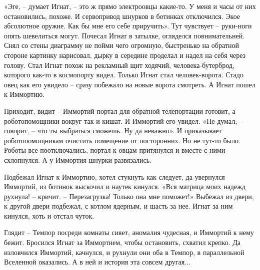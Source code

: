 \documentclass[ebook,oneside,final,openright]{memoir}
\begin{document}
\par
«Эге, – думает Игнат, – это ж прямо электроовцы какие-то. У меня и часы от них остановились, похоже. И сервопривод шнурков в ботинках отключился. Экое абсолютное оружие. Как бы мне его себе приручить». Тут чувствует – руки-ноги опять шевелиться могут. Почесал Игнат в затылке, огляделся повнимательней. Снял со стены диаграмму не пойми чего огромную, быстренько на обратной стороне картинку нарисовал, дырку в середине проделал и надел на себя через голову. Стал Игнат похож на рекламный щит ходячий, человека-бутерброд, которого как-то в космопорту видел. Только Игнат стал человек-ворота. Стадо овец как его увидело – сразу побежало на новые ворота смотреть. А Игнат пошел к Иммортию.\par
\par
Приходит, видит – Иммортий портал для обратной телепортации готовит, а роботопомощники вокруг так и кишат. И Иммортий его увидел. «Не думал, – говорит, – что ты выбраться сможешь. Ну да неважно». И приказывает роботопомощникам очистить помещение от посторонних. Но не тут-то было. Роботы все поотключались, портал к овцам притянулся и вместе с ними схлопнулся. А у Иммортия шнурки развязались.\par
\par
Подбежал Игнат к Иммортию, хотел стукнуть как следует, да увернулся Иммортий, из ботинок выскочил и наутек кинулся. «Вся матрица моих надежд рухнула! – кричит. – Перезагрузка! Только она мне поможет!» Выбежал из двери, к другой двери подбежал, с котлом ядерным, и шасть за нее. Игнат за ним кинулся, хоть и отстал чуток.\par
\par
Глядит – Темпор посреди комнаты сияет, аномалия чудесная, и Иммортий к нему бежит. Бросился Игнат за Иммортием, чтобы остановить, схватил крепко. Да изловчился Иммортий, качнулся, и рухнули они оба в Темпор, в параллельной Вселенной оказались. А в ней и история эта совсем другая...\par
\end{document}
